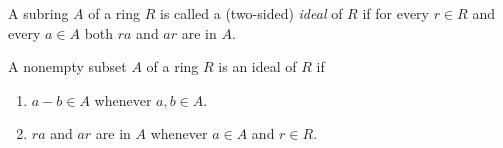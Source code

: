 
\begin{definition}[Ideal]
	A subring $A$ of a ring $R$ is called a (two-sided) \textit{ideal} of $R$ if for every $r \in R$ and every $a \in A$ both $ra$ and $ar$ are in $A$.
\end{definition}

\begin{theorem}
	A nonempty subset $A$ of a ring $R$ is an ideal of $R$ if
	\begin{enumerate}
		\item $a-b \in A$ whenever $a,b \in A$.
		\item $ra$ and $ar$ are in $A$ whenever $a \in A$ and $r \in R$.
	\end{enumerate}
\end{theorem}
